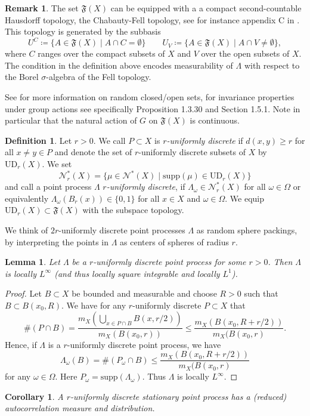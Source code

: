 \documentclass[12pt,reqno,a4paper]{amsart}
\theoremstyle{theorem}
\newtheorem{lemma}[theorem]{Lemma}
\newtheorem{corollary}[theorem]{Corollary}
\theoremstyle{definition}
\newtheorem{definition}[theorem]{Definition}
\newtheorem{remark}[theorem]{Remark}
\numberwithin{theorem}{section}
\numberwithin{equation}{section}
\newcommand{\UD}{\mathrm{UD}}
\newcommand{\supp}{\mathrm{supp}}
\begin{document}
\begin{remark}
	The set $\mathfrak{F}(X)$ can be equipped with a a compact second-countable Hausdorff topology, the Chabauty-Fell topology, see for instance appendix C in \cite{Molchanov}. This topology is generated by the subbasis
	\[U^C\coloneqq \{A\in \mathfrak{F}(X)\mid A\cap C=\emptyset\}\qquad U_V\coloneqq \{A\in \mathfrak{F}(X)\mid A\cap V\neq \emptyset\},\]
	where $C$ ranges over the compact subsets of $X$ and $V$ over the open subsets of $X$. 
	The condition in the definition above encodes measurability of $\Lambda$ with respect to the Borel $\sigma$-algebra of the Fell topology.
\end{remark}

See \cite{Molchanov} for more information on random closed/open sets, for invariance properties under group actions see specifically Proposition 1.3.30 and Section 1.5.1. Note in particular that the natural action of $G$ on $\mathfrak{F}(X)$ is continuous.

\begin{definition}
	Let $r>0$.
	We call $P\subset X$ is \emph{$r$-uniformly discrete} if $d(x,y)\geq r$ for all $x\neq y\in P$ and denote the set of $r$-uniformly discrete subsets of $X$ by $\UD_r(X)$.
	We set \[\mathcal{N}^*_r(X)=\{\mu\in \mathcal{N}^*(X)\mid \supp(\mu)\in\UD_r(X)\}\]
	and call a point process $\Lambda$ \emph{$r$-uniformly discrete}, if 
	$\Lambda_\omega\in \mathcal{N}_r^*(X)$ for all $\omega\in \Omega$ or equivalently $\Lambda_\omega(B_r(x))\in \{0,1\}$ for all $x\in X$ and $\omega\in \Omega$.
	We equip $\UD_r(X)\subset \mathfrak{F}(X)$ with the subspace topology.
\end{definition}

We think of $2r$-uniformly discrete point processes $\Lambda$ as random sphere packings, by interpreting the points in $\Lambda$ as centers of spheres of radius $r$.

\begin{lemma}\label{l:uniform_discrete_implies_locally_Lp}
	Let $\Lambda$ be a $r$-uniformly discrete point process for some $r>0$. Then $\Lambda$ is locally $L^\infty$ (and thus  locally square integrable and locally $L^1$).
\end{lemma}
\begin{proof}
	Let $B\subset X$ be bounded and measurable and choose $R>0$ such that $B\subset B(x_0, R)$.
	We have for any $r$-uniformly discrete $P\subset X$ that 
	\[\#(P\cap B) = \frac{m_X(\bigcup_{x\in P\cap B}B(x,r/2))}{m_X(B(x_0,r))}\leq \frac{m_X(B(x_0, R+r/2))}{m_X(B(x_0,r)}.\]
	Hence, if $\Lambda$ is a $r$-uniformly discrete point process, we have
	\[\Lambda_\omega(B) = \#(P_\omega\cap B) \leq \frac{m_X(B(x_0, R+r/2))}{m_X(B(x_0,r)}\]
	for any $\omega\in \Omega$. Here $P_\omega=\supp(\Lambda_\omega)$.
	Thus $\Lambda$ is locally $L^\infty$.
\end{proof}
\begin{corollary}
	A $r$-uniformly discrete stationary point process has a (reduced) autocorrelation measure and distribution.
\end{corollary}
\end{document}
